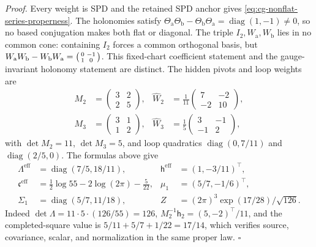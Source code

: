 \noindent\emph{Proof.}
Every weight is SPD and the retained SPD anchor gives
\eqref{eq:cg-nonflat-series-properness}. The holonomies satisfy
\(\Theta_{\mathrm a}\Theta_{\mathrm b}-\Theta_{\mathrm b}\Theta_{\mathrm a}
=\operatorname{diag}(1,-1)\neq0\), so no based conjugation makes both flat or
diagonal. The triple \(I_2,W_{\mathrm a},W_{\mathrm b}\) lies in no common cone:
containing \(I_2\) forces a common orthogonal basis, but
\(W_{\mathrm a}W_{\mathrm b}-W_{\mathrm b}W_{\mathrm a}
=\begin{psmallmatrix}0&-1\\1&0\end{psmallmatrix}\). This fixed-chart
coefficient statement and the gauge-invariant holonomy statement are distinct.
The hidden pivots and loop weights are
\begin{equation}
\begin{aligned}
M_2&=\begin{pmatrix}3&2\\2&5\end{pmatrix},&
\widehat W_2&=\frac1{11}\begin{pmatrix}7&-2\\-2&10\end{pmatrix},\\
M_3&=\begin{pmatrix}3&1\\1&2\end{pmatrix},&
\widehat W_3&=\frac15\begin{pmatrix}3&-1\\-1&2\end{pmatrix},
\end{aligned}
\label{eq:cg-nonflat-series-example-pivots}
\end{equation}
with \(\det M_2=11\), \(\det M_3=5\), and loop quadratics
\(\operatorname{diag}(0,7/11)\) and \(\operatorname{diag}(2/5,0)\). The formulas
above give
\begin{equation}
\begin{aligned}
\Lambda^{\mathrm{eff}}&=\operatorname{diag}(7/5,18/11),&
\mathsf h^{\mathrm{eff}}&=(1,-3/11)^\top,\\
\mathfrak c^{\mathrm{eff}}
 &=\frac12\log55-2\log(2\pi)-\frac5{22},&
\mu_1&=(5/7,-1/6)^\top,\\
\Sigma_1&=\operatorname{diag}(5/7,11/18),&
Z&=(2\pi)^3\exp(17/28)/\sqrt{126}.
\end{aligned}
\label{eq:cg-nonflat-series-example-law}
\end{equation}
Indeed \(\det\Lambda=11\cdot5\cdot(126/55)=126\),
\(M_2^{-1}\mathsf h_2=(5,-2)^\top/11\), and the completed-square value is
\(5/11+5/7+1/22=17/14\), which verifies source, covariance, scalar, and
normalization in the same proper law. \(\square\)

